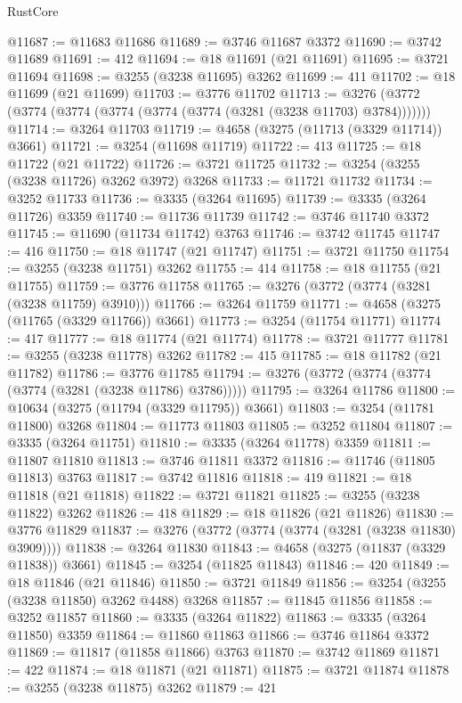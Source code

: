 \begin{lexlean}{RustCore}
\begin{coremodule}
@11687 := @11683 @11686
@11689 := @3746 @11687 @3372
@11690 := @3742 @11689
@11691 := 412
@11694 := @18 @11691 (@21 @11691)
@11695 := @3721 @11694
@11698 := @3255 (@3238 @11695) @3262
@11699 := 411
@11702 := @18 @11699 (@21 @11699)
@11703 := @3776 @11702
@11713 := @3276 (@3772 (@3774 (@3774 (@3774 (@3774 (@3774 (@3281 (@3238 @11703) @3784)))))))
@11714 := @3264 @11703
@11719 := @4658 (@3275 (@11713 (@3329 @11714)) @3661)
@11721 := @3254 (@11698 @11719)
@11722 := 413
@11725 := @18 @11722 (@21 @11722)
@11726 := @3721 @11725
@11732 := @3254 (@3255 (@3238 @11726) @3262 @3972) @3268
@11733 := @11721 @11732
@11734 := @3252 @11733
@11736 := @3335 (@3264 @11695)
@11739 := @3335 (@3264 @11726) @3359
@11740 := @11736 @11739
@11742 := @3746 @11740 @3372
@11745 := @11690 (@11734 @11742) @3763
@11746 := @3742 @11745
@11747 := 416
@11750 := @18 @11747 (@21 @11747)
@11751 := @3721 @11750
@11754 := @3255 (@3238 @11751) @3262
@11755 := 414
@11758 := @18 @11755 (@21 @11755)
@11759 := @3776 @11758
@11765 := @3276 (@3772 (@3774 (@3281 (@3238 @11759) @3910)))
@11766 := @3264 @11759
@11771 := @4658 (@3275 (@11765 (@3329 @11766)) @3661)
@11773 := @3254 (@11754 @11771)
@11774 := 417
@11777 := @18 @11774 (@21 @11774)
@11778 := @3721 @11777
@11781 := @3255 (@3238 @11778) @3262
@11782 := 415
@11785 := @18 @11782 (@21 @11782)
@11786 := @3776 @11785
@11794 := @3276 (@3772 (@3774 (@3774 (@3774 (@3281 (@3238 @11786) @3786)))))
@11795 := @3264 @11786
@11800 := @10634 (@3275 (@11794 (@3329 @11795)) @3661)
@11803 := @3254 (@11781 @11800) @3268
@11804 := @11773 @11803
@11805 := @3252 @11804
@11807 := @3335 (@3264 @11751)
@11810 := @3335 (@3264 @11778) @3359
@11811 := @11807 @11810
@11813 := @3746 @11811 @3372
@11816 := @11746 (@11805 @11813) @3763
@11817 := @3742 @11816
@11818 := 419
@11821 := @18 @11818 (@21 @11818)
@11822 := @3721 @11821
@11825 := @3255 (@3238 @11822) @3262
@11826 := 418
@11829 := @18 @11826 (@21 @11826)
@11830 := @3776 @11829
@11837 := @3276 (@3772 (@3774 (@3774 (@3281 (@3238 @11830) @3909))))
@11838 := @3264 @11830
@11843 := @4658 (@3275 (@11837 (@3329 @11838)) @3661)
@11845 := @3254 (@11825 @11843)
@11846 := 420
@11849 := @18 @11846 (@21 @11846)
@11850 := @3721 @11849
@11856 := @3254 (@3255 (@3238 @11850) @3262 @4488) @3268
@11857 := @11845 @11856
@11858 := @3252 @11857
@11860 := @3335 (@3264 @11822)
@11863 := @3335 (@3264 @11850) @3359
@11864 := @11860 @11863
@11866 := @3746 @11864 @3372
@11869 := @11817 (@11858 @11866) @3763
@11870 := @3742 @11869
@11871 := 422
@11874 := @18 @11871 (@21 @11871)
@11875 := @3721 @11874
@11878 := @3255 (@3238 @11875) @3262
@11879 := 421

\end{coremodule}
\end{lexlean}
